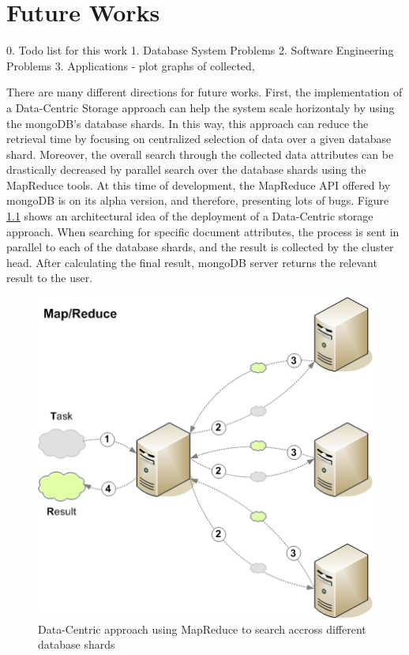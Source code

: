 \chapter{Future Works}

0. Todo list for this work
1. Database System Problems
2. Software Engineering Problems
3. Applications
 - plot graphs of collected, 

There are many different directions for future works. First, the
implementation of a Data-Centric Storage approach can help the system scale
horizontaly by using the mongoDB's database shards. In this way, this approach
can reduce the retrieval time by focusing on centralized selection of data over
a given database shard. Moreover, the overall search through the collected data
attributes can be drastically decreased by parallel search over the database
shards using the MapReduce \cite{map-reduce} tools. At this time of
development, the MapReduce API offered by mongoDB is on its alpha version, and
therefore, presenting lots of bugs. Figure
\ref{fig:future-works-data-centric-map-reduce} shows an architectural idea of
the deployment of a Data-Centric storage approach. When searching for specific
document attributes, the process is sent in parallel to each of the database
shards, and the result is collected by the cluster head. After calculating the
final result, mongoDB server returns the relevant result to the user.

\begin{figure}[h]
  \centering
  \includegraphics[scale=0.5]{../diagrams/future-works-data-centric-map-reduce}
  \caption{Data-Centric approach using MapReduce to search accross different
  database shards}
  \label{fig:future-works-data-centric-map-reduce}
\end{figure}

